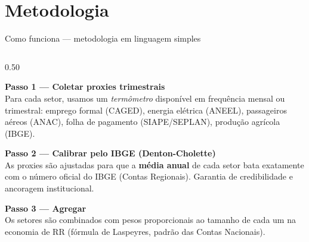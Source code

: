 \documentclass[aspectratio=169, 11pt]{beamer}
\begin{document}
\section{Metodologia}

\begin{frame}{Como funciona — metodologia em linguagem simples}

  \begin{columns}[T]
    \begin{column}{0.50\textwidth}

    \textbf{Passo 1 — Coletar proxies trimestrais}\\[4pt]
    Para cada setor, usamos um \textit{termômetro} disponível em frequência mensal
    ou trimestral: emprego formal (CAGED), energia elétrica (ANEEL), passageiros
    aéreos (ANAC), folha de pagamento (SIAPE/SEPLAN), produção agrícola (IBGE).

    \vspace{0.4cm}

    \textbf{Passo 2 — Calibrar pelo IBGE (Denton-Cholette)}\\[4pt]
    As proxies são ajustadas para que a \textbf{média anual} de cada setor bata
    exatamente com o número oficial do IBGE (Contas Regionais). Garantia de
    credibilidade e ancoragem institucional.

    \vspace{0.4cm}

    \textbf{Passo 3 — Agregar}\\[4pt]
    Os setores são combinados com pesos proporcionais ao tamanho de cada um
    na economia de RR (fórmula de Laspeyres, padrão das Contas Nacionais).

    \end{column}


\end{columns}
\end{frame}
\end{document}
